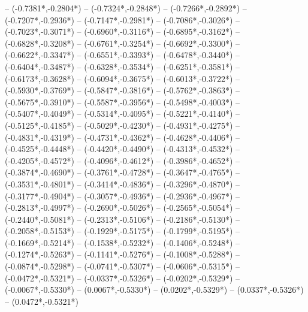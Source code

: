 {	-- ({-0.7381*\dx},{-0.2804*\dy})
	-- ({-0.7324*\dx},{-0.2848*\dy})
	-- ({-0.7266*\dx},{-0.2892*\dy})
	-- ({-0.7207*\dx},{-0.2936*\dy})
	-- ({-0.7147*\dx},{-0.2981*\dy})
	-- ({-0.7086*\dx},{-0.3026*\dy})
	-- ({-0.7023*\dx},{-0.3071*\dy})
	-- ({-0.6960*\dx},{-0.3116*\dy})
	-- ({-0.6895*\dx},{-0.3162*\dy})
	-- ({-0.6828*\dx},{-0.3208*\dy})
	-- ({-0.6761*\dx},{-0.3254*\dy})
	-- ({-0.6692*\dx},{-0.3300*\dy})
	-- ({-0.6622*\dx},{-0.3347*\dy})
	-- ({-0.6551*\dx},{-0.3393*\dy})
	-- ({-0.6478*\dx},{-0.3440*\dy})
	-- ({-0.6404*\dx},{-0.3487*\dy})
	-- ({-0.6328*\dx},{-0.3534*\dy})
	-- ({-0.6251*\dx},{-0.3581*\dy})
	-- ({-0.6173*\dx},{-0.3628*\dy})
	-- ({-0.6094*\dx},{-0.3675*\dy})
	-- ({-0.6013*\dx},{-0.3722*\dy})
	-- ({-0.5930*\dx},{-0.3769*\dy})
	-- ({-0.5847*\dx},{-0.3816*\dy})
	-- ({-0.5762*\dx},{-0.3863*\dy})
	-- ({-0.5675*\dx},{-0.3910*\dy})
	-- ({-0.5587*\dx},{-0.3956*\dy})
	-- ({-0.5498*\dx},{-0.4003*\dy})
	-- ({-0.5407*\dx},{-0.4049*\dy})
	-- ({-0.5314*\dx},{-0.4095*\dy})
	-- ({-0.5221*\dx},{-0.4140*\dy})
	-- ({-0.5125*\dx},{-0.4185*\dy})
	-- ({-0.5029*\dx},{-0.4230*\dy})
	-- ({-0.4931*\dx},{-0.4275*\dy})
	-- ({-0.4831*\dx},{-0.4319*\dy})
	-- ({-0.4731*\dx},{-0.4362*\dy})
	-- ({-0.4628*\dx},{-0.4406*\dy})
	-- ({-0.4525*\dx},{-0.4448*\dy})
	-- ({-0.4420*\dx},{-0.4490*\dy})
	-- ({-0.4313*\dx},{-0.4532*\dy})
	-- ({-0.4205*\dx},{-0.4572*\dy})
	-- ({-0.4096*\dx},{-0.4612*\dy})
	-- ({-0.3986*\dx},{-0.4652*\dy})
	-- ({-0.3874*\dx},{-0.4690*\dy})
	-- ({-0.3761*\dx},{-0.4728*\dy})
	-- ({-0.3647*\dx},{-0.4765*\dy})
	-- ({-0.3531*\dx},{-0.4801*\dy})
	-- ({-0.3414*\dx},{-0.4836*\dy})
	-- ({-0.3296*\dx},{-0.4870*\dy})
	-- ({-0.3177*\dx},{-0.4904*\dy})
	-- ({-0.3057*\dx},{-0.4936*\dy})
	-- ({-0.2936*\dx},{-0.4967*\dy})
	-- ({-0.2813*\dx},{-0.4997*\dy})
	-- ({-0.2690*\dx},{-0.5026*\dy})
	-- ({-0.2565*\dx},{-0.5054*\dy})
	-- ({-0.2440*\dx},{-0.5081*\dy})
	-- ({-0.2313*\dx},{-0.5106*\dy})
	-- ({-0.2186*\dx},{-0.5130*\dy})
	-- ({-0.2058*\dx},{-0.5153*\dy})
	-- ({-0.1929*\dx},{-0.5175*\dy})
	-- ({-0.1799*\dx},{-0.5195*\dy})
	-- ({-0.1669*\dx},{-0.5214*\dy})
	-- ({-0.1538*\dx},{-0.5232*\dy})
	-- ({-0.1406*\dx},{-0.5248*\dy})
	-- ({-0.1274*\dx},{-0.5263*\dy})
	-- ({-0.1141*\dx},{-0.5276*\dy})
	-- ({-0.1008*\dx},{-0.5288*\dy})
	-- ({-0.0874*\dx},{-0.5298*\dy})
	-- ({-0.0741*\dx},{-0.5307*\dy})
	-- ({-0.0606*\dx},{-0.5315*\dy})
	-- ({-0.0472*\dx},{-0.5321*\dy})
	-- ({-0.0337*\dx},{-0.5326*\dy})
	-- ({-0.0202*\dx},{-0.5329*\dy})
	-- ({-0.0067*\dx},{-0.5330*\dy})
	-- ({0.0067*\dx},{-0.5330*\dy})
	-- ({0.0202*\dx},{-0.5329*\dy})
	-- ({0.0337*\dx},{-0.5326*\dy})
	-- ({0.0472*\dx},{-0.5321*\dy})
}
